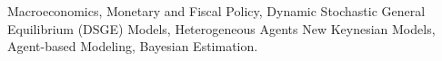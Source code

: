 

\begin{cvparagraph}

Macroeconomics, Monetary and Fiscal Policy, Dynamic Stochastic General Equilibrium (DSGE) Models, Heterogeneous Agents New Keynesian Models, Agent-based Modeling, Bayesian Estimation.
\end{cvparagraph}